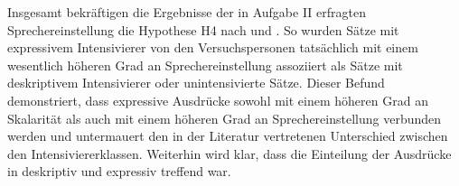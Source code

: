 Insgesamt bekräftigen die Ergebnisse der in Aufgabe II erfragten Sprechereinstellung die Hypothese H4 nach \citet[315]{Lang.1983} und {\citet[57]{Ortner.2014}}. So wurden Sätze mit expressivem Intensivierer von den Versuchspersonen tatsächlich mit einem wesentlich höheren Grad an Sprechereinstellung assoziiert als Sätze mit deskriptivem Intensivierer oder unintensivierte Sätze. Dieser Befund demonstriert, dass expressive Ausdrücke sowohl mit einem höheren Grad an Skalarität als auch mit einem höheren Grad an Sprechereinstellung verbunden werden und untermauert den in der Literatur vertretenen Unterschied zwischen den Intensiviererklassen. Weiterhin wird klar, dass die Einteilung der Ausdrücke in deskriptiv und expressiv {treffend war}.
 







